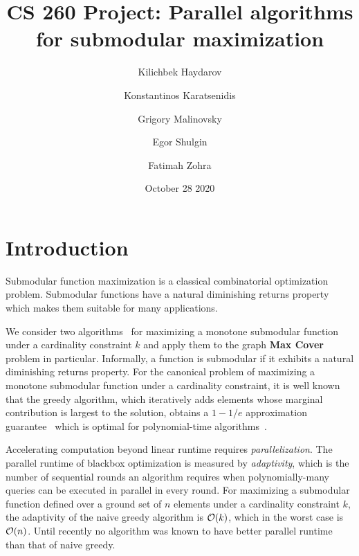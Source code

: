 \documentclass[11pt, a4paper]{article}
\title{CS 260 Project: Parallel algorithms for submodular maximization}
\author{Kilichbek Haydarov \and Konstantinos Karatsenidis \and Grigory Malinovsky \and Egor Shulgin \and Fatimah Zohra}
\date{October 28 2020}
\begin{document}
\maketitle

\section{Introduction}
Submodular function maximization is a classical combinatorial optimization problem. Submodular functions have a natural diminishing returns property which makes them suitable for many applications. 

We consider two algorithms~\cite{chekuri2018submodular, breuer2019fast} for maximizing a monotone submodular function under a cardinality constraint $k$ and apply them to the graph \textbf{Max Cover} problem in particular.
Informally, a function is submodular if it exhibits a natural diminishing returns property.  For the canonical problem of maximizing a monotone submodular function under a cardinality constraint, it is well known that the greedy algorithm, which iteratively adds elements whose marginal contribution is largest to the solution, obtains a $1-1/e$ approximation guarantee~\cite{NWF78} which is optimal for polynomial-time algorithms~\cite{nemhauser1978best}.

Accelerating computation beyond linear runtime requires \emph{parallelization}.  The parallel runtime of blackbox optimization is measured by \emph{adaptivity}, which is the number of sequential rounds an algorithm requires when polynomially-many queries can be executed in parallel in every round.  For maximizing a submodular function defined over a ground set of $n$ elements under a cardinality constraint $k$, the adaptivity of the naive greedy algorithm is ${\cal O}(k)$, which in the worst case is ${\cal O}(n)$.  Until recently no algorithm was known to have better parallel runtime than that of naive greedy. 
\end{document}
